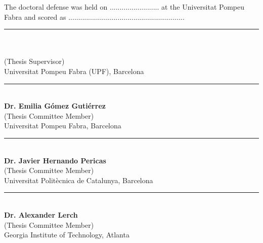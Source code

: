 \thispagestyle{empty}


\newcommand\advisor[2]{
\vspace{1.3cm}
\begin{center}
	\rule{6cm}{0.8pt}\\
	\textbf{#1}\\
	(Thesis Supervisor)\\
	#2
\end{center}
}
\newcommand\member[2]{
\vspace{1.3cm}
\begin{center}
	\rule{6cm}{0.8pt}\\
	\textbf{#1}\\
	(Thesis Committee Member) \\
	#2
\end{center}
} 

\noindent The doctoral defense was held on ......................... at the Universitat Pompeu Fabra and scored as ...........................................................\par
\advisor{\supervisor}{Universitat Pompeu Fabra (UPF), Barcelona}
\vspace*{0.3cm}

\member{Dr. Emilia Gómez Gutiérrez}{Universitat Pompeu Fabra, Barcelona}
\member{Dr. Javier Hernando Pericas}{Universitat Politècnica de Catalunya, Barcelona}
\member{Dr. Alexander Lerch}{Georgia Institute of Technology, Atlanta}
%
%
%
%
  

